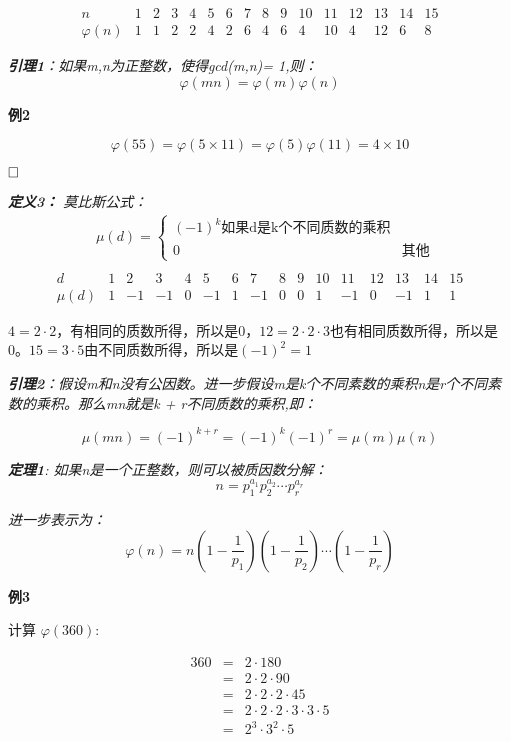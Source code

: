 \documentclass{article}
\begin{document}
$$
\begin{array}{c|ccccccccccccccc}
n & 1 & 2 & 3 & 4 & 5 & 6 & 7 & 8 & 9 & 10 & 11 & 12 & 13 & 14 & 15 \\
\hline \varphi(n) & 1 & 1 & 2 & 2 & 4 & 2 & 6 & 4 & 6 & 4 & 10 & 4 & 12 & 6 & 8
\end{array}
$$

\textit{\textbf{引理1}：如果m,n为正整数，使得gcd(m,n)= 1,则：}
$$\varphi(mn) = \varphi(m)\varphi(n)$$

\textbf{例2}

$$\varphi(55) = \varphi(5 \times 11) = \varphi(5)\varphi(11) = 4 \times 10$$


$\hfill\square$ 

\textit{\textbf{定义3：} 莫比斯公式：
$$
\begin{aligned}
&\mu(d)=\left\{\begin{array}{ll}
(-1)^{k} \mbox{如果d是k个不同质数的乘积} \\
0 & \mbox{其他} 
\end{array}\right.\\
\end{aligned}
$$
$$
\begin{array}{c|ccccccccccccccc}
d & 1 & 2 & 3 & 4 & 5 & 6 & 7 & 8 & 9 & 10 & 11 & 12 & 13 & 14 & 15 \\
\hline \mu(d) & 1 & -1 & -1 & 0 & -1 & 1 & -1 & 0 & 0 & 1 & -1 & 0 & -1 & 1 & 1
\end{array}
$$
}

$4 = 2 \cdot 2$，有相同的质数所得，所以是0，$12 = 2 \cdot 2 \cdot 3$也有相同质数所得，所以是0。$15 = 3 \cdot 5$由不同质数所得，所以是$(-1)^2 = 1$

\textit{\textbf{引理2}：假设m和n没有公因数。进一步假设m是k个不同素数的乘积n是r个不同素数的乘积。那么mn就是k + r不同质数的乘积,即：
}

$$\mu(mn) = (-1)^{k+r} = (-1)^k(-1)^r = \mu(m)\mu(n)$$

\textit{\textbf{定理1}: 如果n是一个正整数，则可以被质因数分解：}
$$n = p_1^{a_1}p_2^{a_2}\cdots p_r^{a_r}$$

\textit{进一步表示为：}
$$\varphi(n) = n \left(1 - \frac{1}{p_1} \right)\left(1 - \frac{1}{p_2}\right) \cdots \left(1 - \frac{1}{p_r}\right)$$


\textbf{例3}

计算 $\varphi(360)$:


\begin{eqnarray}   
\label{eq}
360&=& 2 \cdot 180  \nonumber \\ 
&=&  2  \cdot 2 \cdot 90 \nonumber \\ 
&=& 2  \cdot 2  \cdot 2  \cdot 45  \nonumber \\ 
&=& 2  \cdot 2  \cdot 2  \cdot 3  \cdot 3 \cdot 5 \nonumber \\ 
&=& 2^3 \cdot 3^2 \cdot 5 \nonumber \\ 
\nonumber 
\end{eqnarray}
\end{document}
